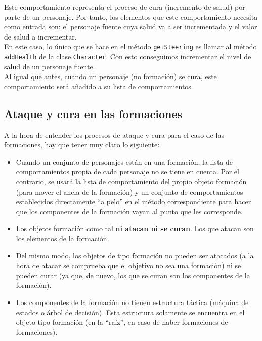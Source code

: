 Este comportamiento representa el proceso de cura (incremento de salud) por parte de un personaje. Por tanto, los elementos que este comportamiento necesita como entrada son: el personaje fuente cuya salud va a ser incrementada y el valor de salud a incrementar. \\

En este caso, lo único que se hace en el método \texttt{getSteering} es llamar al método \texttt{addHealth} de la clase \texttt{Character}. Con esto conseguimos incrementar el nivel de salud de un personaje fuente. \\

Al igual que antes, cuando un personaje (no formación) se cura, este comportamiento será añadido a su lista de comportamientos.

\subsection{Ataque y cura en las formaciones}

A la hora de entender los procesos de ataque y cura para el caso de las formaciones, hay que tener muy claro lo siguiente:
\begin{itemize}
	\item Cuando un conjunto de personajes están en una formación, la lista de comportamientos propia de cada personaje no se tiene en cuenta. Por el contrario, se usará la lista de comportamiento del propio objeto formación (para mover el ancla de la formación) y un conjunto de comportamientos establecidos directamente ``a pelo'' en el método correspondiente para hacer que los componentes de la formación vayan al punto que les corresponde.
	\item Los objetos formación como tal \textbf{ni atacan ni se curan}. Los que atacan son los elementos de la formación.
	\item Del mismo modo, los objetos de tipo formación no pueden ser atacados (a la hora de atacar se comprueba que el objetivo no sea una formación) ni se pueden curar (ya que, de nuevo, los que se curan son los componentes de la formación).
	\item Los componentes de la formación no tienen estructura táctica (máquina de estados o árbol de decisión). Esta estructura solamente se encuentra en el objeto tipo formación (en la ``raíz'', en caso de haber formaciones de formaciones).
\end{itemize}

